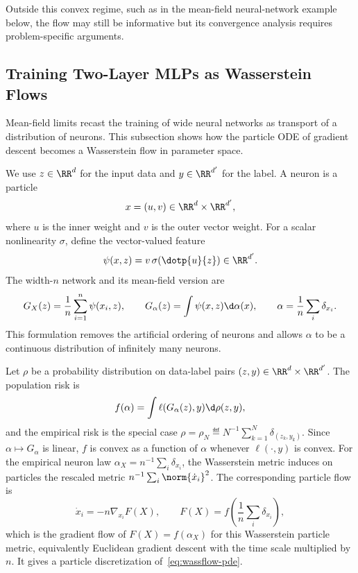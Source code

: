 Outside this convex regime, such as in the mean-field neural-network example below, the flow may still be informative but its convergence analysis requires problem-specific arguments.


\subsection{Training Two-Layer MLPs as Wasserstein Flows}

Mean-field limits recast the training of wide neural networks as transport of a distribution of neurons. This subsection shows how the particle ODE of gradient descent becomes a Wasserstein flow in parameter space.

We use $z\in\RR^d$ for the input data and $y\in\RR^{d'}$ for the label. A neuron is a particle
\[
	x=(u,v)\in\RR^d\times\RR^{d'},
\]
where $u$ is the inner weight and $v$ is the outer vector weight. For a scalar nonlinearity $\sigma$, define the vector-valued feature
\[
	\psi(x,z)=v\,\sigma(\dotp{u}{z})\in\RR^{d'}.
\]
The width-$n$ network and its mean-field version are
\[
	G_X(z)=\frac1n\sum_{i=1}^n\psi(x_i,z),
	\qquad
	G_\alpha(z)=\int\psi(x,z)\d\alpha(x),
	\qquad
	\alpha=\frac1n\sum_i\delta_{x_i}.
\]
This formulation removes the artificial ordering of neurons and allows $\alpha$ to be a continuous distribution of infinitely many neurons.

Let $\rho$ be a probability distribution on data-label pairs $(z,y)\in\RR^d\times\RR^{d'}$. The population risk is
\[
	f(\alpha)=\int \ell(G_\alpha(z),y)\d\rho(z,y),
\]
and the empirical risk is the special case $\rho=\rho_N\eqdef N^{-1}\sum_{k=1}^N\delta_{(z_k,y_k)}$. Since $\alpha\mapsto G_\alpha$ is linear, $f$ is convex as a function of $\alpha$ whenever $\ell(\cdot,y)$ is convex. For the empirical neuron law $\alpha_X=n^{-1}\sum_i\delta_{x_i}$, the Wasserstein metric induces on particles the rescaled metric $n^{-1}\sum_i\norm{\dot x_i}^2$. The corresponding particle flow is
\[
	\dot x_i=-n\nabla_{x_i}F(X),
	\qquad
	F(X)=f\!\left(\frac1n\sum_i\delta_{x_i}\right),
\]
which is the gradient flow of $F(X)=f(\alpha_X)$ for this Wasserstein particle metric, equivalently Euclidean gradient descent with the time scale multiplied by $n$. It gives a particle discretization of~\eqref{eq:wassflow-pde}.

